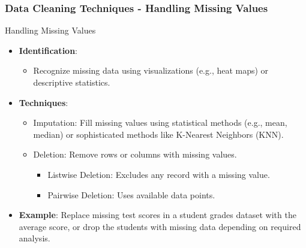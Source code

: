 \documentclass[aspectratio=169]{beamer}
\begin{document}
\begin{frame}[fragile]
    \frametitle{Data Cleaning Techniques - Handling Missing Values}
    \begin{block}{Handling Missing Values}
        \begin{itemize}
            \item \textbf{Identification}:
            \begin{itemize}
                \item Recognize missing data using visualizations (e.g., heat maps) or descriptive statistics.
            \end{itemize}
            \item \textbf{Techniques}:
            \begin{itemize}
                \item Imputation: Fill missing values using statistical methods (e.g., mean, median) or sophisticated methods like K-Nearest Neighbors (KNN).
                \item Deletion: Remove rows or columns with missing values.
                \begin{itemize}
                    \item Listwise Deletion: Excludes any record with a missing value.
                    \item Pairwise Deletion: Uses available data points.
                \end{itemize}
            \end{itemize}
            \item \textbf{Example}: Replace missing test scores in a student grades dataset with the average score, or drop the students with missing data depending on required analysis.
        \end{itemize}
    \end{block}
\end{frame}
\end{document}
